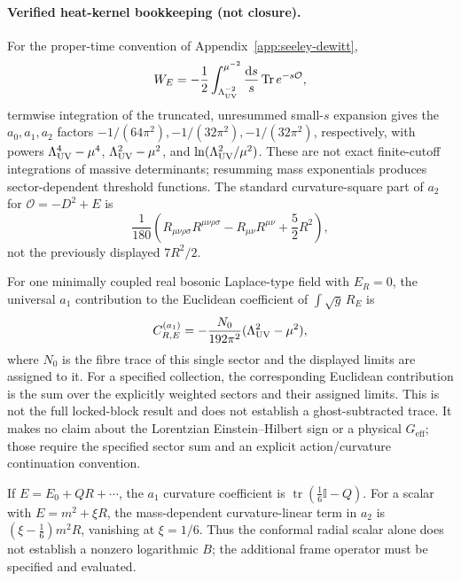 \paragraph{Verified heat-kernel bookkeeping (not closure).}
For the proper-time convention of Appendix~\ref{app:seeley-dewitt},
\[
W_E=-\frac12\int_{\Lambda_{\mathrm{UV}}^{-2}}^{\mu^{-2}}\frac{\mathrm{d}s}{s}\,
\mathrm{Tr}\,e^{-s\mathcal O},
\]
termwise integration of the truncated, unresummed small-\(s\)
expansion gives the \(a_0,a_1,a_2\) factors
\(-1/(64\pi^2),-1/(32\pi^2),-1/(32\pi^2)\), respectively, with
powers \(\Lambda_{\mathrm{UV}}^4-\mu^4\), \(\Lambda_{\mathrm{UV}}^2-\mu^2\), and
\(\ln(\Lambda_{\mathrm{UV}}^2/\mu^2)\). These are not exact finite-cutoff
integrations of massive determinants; resumming mass exponentials
produces sector-dependent threshold functions. The standard
curvature-square part of \(a_2\) for \(\mathcal O=-D^2+E\) is
\[
\frac1{180}\left(R_{\mu\nu\rho\sigma}R^{\mu\nu\rho\sigma}
-R_{\mu\nu}R^{\mu\nu}+\frac52R^2\right),
\]
not the previously displayed \(7R^2/2\).

For one minimally coupled real bosonic Laplace-type field with
\(E_R=0\), the universal \(a_1\) contribution to the Euclidean
coefficient of \(\int\sqrt{g}\,R_E\) is
\[
C_{R,E}^{(a_1)}
=-\frac{N_0}{192\pi^2}(\Lambda_{\mathrm{UV}}^2-\mu^2),
\]
where \(N_0\) is the fibre trace of this single sector and the
displayed limits are assigned to it. For a specified collection,
the corresponding Euclidean contribution is the sum over the
explicitly weighted sectors and their assigned limits. This is not
the full locked-block result and does not establish a ghost-subtracted
trace. It makes no claim about the Lorentzian Einstein--Hilbert sign
or a physical \(G_{\mathrm{eff}}\); those require the specified
sector sum and an explicit action/curvature continuation convention.

If \(E=E_0+QR+\cdots\), the \(a_1\) curvature coefficient is
\(\operatorname{tr}(\tfrac16\mathbb I-Q)\). For a scalar with
\(E=m^2+\xi R\), the mass-dependent curvature-linear term in \(a_2\)
is \((\xi-\tfrac16)m^2R\), vanishing at \(\xi=1/6\). Thus the
conformal radial scalar alone does not establish a nonzero logarithmic
\(B\); the additional frame operator must be specified and evaluated.

